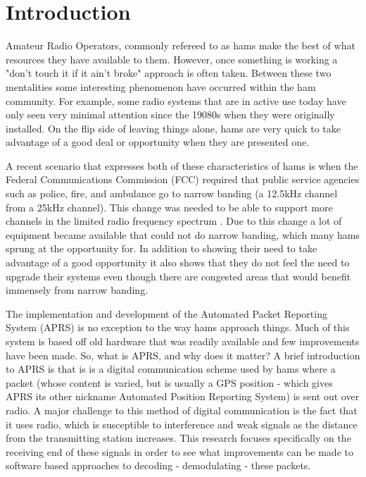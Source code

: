 \chapter{Introduction}

Amateur Radio Operators, commonly refereed to as hams make the best of what resources they have available to them. However, once something is working a "don't touch it if it ain't broke" approach is often taken. Between these two mentalities some interesting phenomenon have occurred within the ham community. For example, some radio systems that are in active use today have only seen very minimal attention since the 19080s when they were originally installed. On the flip side of leaving things alone, hams are very quick to take advantage of a good deal or opportunity when they are presented one.

A recent scenario that expresses both of these characteristics of hams is when the Federal Communications Commission (FCC) required that public service agencies such as police, fire, and ambulance go to narrow banding (a 12.5kHz channel from a 25kHz channel). This change was needed to be able to support more channels in the limited radio frequency spectrum \cite{Commission2012}. Due to this change a lot of equipment became available that could not do narrow banding, which many hams sprung at the opportunity for. In addition to showing their need to take advantage of a good opportunity it also shows that they do not feel the need to upgrade their systems even though there are congested areas that would benefit immensely from narrow banding.

The implementation and development of the Automated Packet Reporting System (APRS) is no exception to the way hams approach things. Much of this system is based off old hardware that was readily available and few improvements have been made. So, what is APRS, and why does it matter? A brief introduction to APRS is that is is a digital communication scheme used by hams where a packet (whose content is varied, but is usually a GPS position - which gives APRS its other nickname Automated Position Reporting System) is sent out over radio. A major challenge to this method of digital communication is the fact that it uses radio, which is susceptible to interference and weak signals as the distance from the transmitting station increases. This research focuses specifically on the receiving end of these signals in order to see what improvements can be made to software based approaches to decoding - demodulating - these packets. 

